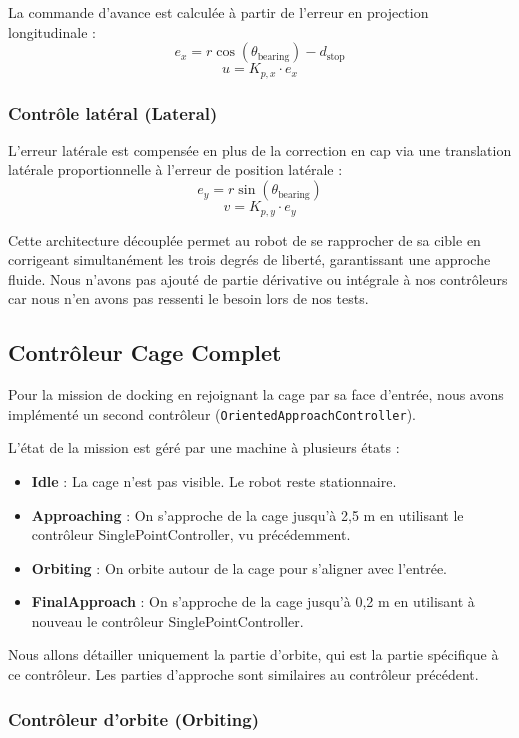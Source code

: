 La commande d'avance est calculée à partir de l'erreur en projection longitudinale :
\[
e_x = r \cos(\theta_{\text{bearing}}) - d_{\text{stop}}
\]
\[
u = K_{p,x} \cdot e_x
\]

\subsubsection*{Contrôle latéral (Lateral)}

L'erreur latérale est compensée en plus de la correction en cap via une translation latérale proportionnelle à l'erreur de position latérale :
\[
e_y = r \sin(\theta_{\text{bearing}})
\]
\[
v = K_{p,y} \cdot e_y
\]

Cette architecture découplée permet au robot de se rapprocher de sa cible en corrigeant simultanément les trois degrés de liberté, garantissant une approche fluide.
Nous n'avons pas ajouté de partie dérivative ou intégrale à nos contrôleurs car nous n'en avons pas ressenti le besoin lors de nos tests.

\subsection{Contrôleur Cage Complet}

Pour la mission de docking en rejoignant la cage par sa face d'entrée, nous avons implémenté un second contrôleur (\texttt{OrientedApproachController}). 

L'état de la mission est géré par une machine à plusieurs états :

\begin{itemize}
    \item \textbf{Idle} : La cage n'est pas visible. Le robot reste stationnaire.
    \item \textbf{Approaching} : On s'approche de la cage jusqu'à 2,5 m en utilisant le contrôleur SinglePointController, vu précédemment.
    \item \textbf{Orbiting} : On orbite autour de la cage pour s'aligner avec l'entrée. 
    \item \textbf{FinalApproach} : On s'approche de la cage jusqu'à 0,2 m en utilisant à nouveau le contrôleur SinglePointController.
\end{itemize}

Nous allons détailler uniquement la partie d'orbite, qui est la partie spécifique à ce contrôleur. Les parties d'approche sont similaires au contrôleur précédent.

\subsubsection*{Contrôleur d'orbite (Orbiting)}

